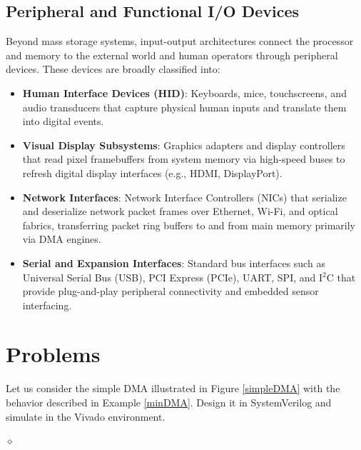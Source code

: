 


\subsection{Peripheral and Functional I/O Devices}

Beyond mass storage systems, input-output architectures connect the processor and memory to the external world and human operators through peripheral devices. These devices are broadly classified into:
\begin{itemize}
    \item \textbf{Human Interface Devices (HID)}: Keyboards, mice, touchscreens, and audio transducers that capture physical human inputs and translate them into digital events.
    \item \textbf{Visual Display Subsystems}: Graphics adapters and display controllers that read pixel framebuffers from system memory via high-speed buses to refresh digital display interfaces (e.g., HDMI, DisplayPort).
    \item \textbf{Network Interfaces}: Network Interface Controllers (NICs) that serialize and deserialize network packet frames over Ethernet, Wi-Fi, and optical fabrics, transferring packet ring buffers to and from main memory primarily via DMA engines.
    \item \textbf{Serial and Expansion Interfaces}: Standard bus interfaces such as Universal Serial Bus (USB), PCI Express (PCIe), UART, SPI, and I$^2$C that provide plug-and-play peripheral connectivity and embedded sensor interfacing.
\end{itemize}

\section{Problems}

\begin{problem}
Let us consider the simple DMA illustrated in Figure \ref{simpleDMA} with the behavior described in Example \ref{minDMA}. Design it in SystemVerilog and simulate in the Vivado environment.

$\diamond$
\end{problem}




